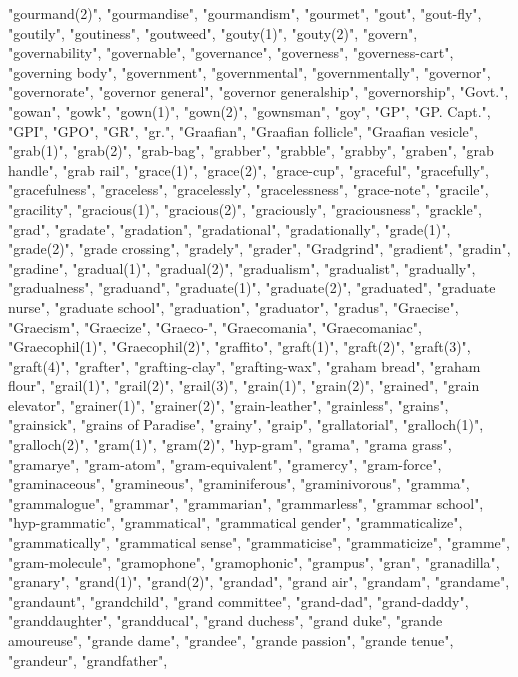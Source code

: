 "gourmand(2)",
"gourmandise",
"gourmandism",
"gourmet",
"gout",
"gout-fly",
"goutily",
"goutiness",
"goutweed",
"gouty(1)",
"gouty(2)",
"govern",
"governability",
"governable",
"governance",
"governess",
"governess-cart",
"governing body",
"government",
"governmental",
"governmentally",
"governor",
"governorate",
"governor general",
"governor generalship",
"governorship",
"Govt.",
"gowan",
"gowk",
"gown(1)",
"gown(2)",
"gownsman",
"goy",
"GP",
"GP. Capt.",
"GPI",
"GPO",
"GR",
"gr.",
"Graafian",
"Graafian follicle",
"Graafian vesicle",
"grab(1)",
"grab(2)",
"grab-bag",
"grabber",
"grabble",
"grabby",
"graben",
"grab handle",
"grab rail",
"grace(1)",
"grace(2)",
"grace-cup",
"graceful",
"gracefully",
"gracefulness",
"graceless",
"gracelessly",
"gracelessness",
"grace-note",
"gracile",
"gracility",
"gracious(1)",
"gracious(2)",
"graciously",
"graciousness",
"grackle",
"grad",
"gradate",
"gradation",
"gradational",
"gradationally",
"grade(1)",
"grade(2)",
"grade crossing",
"gradely",
"grader",
"Gradgrind",
"gradient",
"gradin",
"gradine",
"gradual(1)",
"gradual(2)",
"gradualism",
"gradualist",
"gradually",
"gradualness",
"graduand",
"graduate(1)",
"graduate(2)",
"graduated",
"graduate nurse",
"graduate school",
"graduation",
"graduator",
"gradus",
"Graecise",
"Graecism",
"Graecize",
"Graeco-",
"Graecomania",
"Graecomaniac",
"Graecophil(1)",
"Graecophil(2)",
"graffito",
"graft(1)",
"graft(2)",
"graft(3)",
"graft(4)",
"grafter",
"grafting-clay",
"grafting-wax",
"graham bread",
"graham flour",
"grail(1)",
"grail(2)",
"grail(3)",
"grain(1)",
"grain(2)",
"grained",
"grain elevator",
"grainer(1)",
"grainer(2)",
"grain-leather",
"grainless",
"grains",
"grainsick",
"grains of Paradise",
"grainy",
"graip",
"grallatorial",
"gralloch(1)",
"gralloch(2)",
"gram(1)",
"gram(2)",
"hyp-gram",
"grama",
"grama grass",
"gramarye",
"gram-atom",
"gram-equivalent",
"gramercy",
"gram-force",
"graminaceous",
"gramineous",
"graminiferous",
"graminivorous",
"gramma",
"grammalogue",
"grammar",
"grammarian",
"grammarless",
"grammar school",
"hyp-grammatic",
"grammatical",
"grammatical gender",
"grammaticalize",
"grammatically",
"grammatical sense",
"grammaticise",
"grammaticize",
"gramme",
"gram-molecule",
"gramophone",
"gramophonic",
"grampus",
"gran",
"granadilla",
"granary",
"grand(1)",
"grand(2)",
"grandad",
"grand air",
"grandam",
"grandame",
"grandaunt",
"grandchild",
"grand committee",
"grand-dad",
"grand-daddy",
"granddaughter",
"grandducal",
"grand duchess",
"grand duke",
"grande amoureuse",
"grande dame",
"grandee",
"grande passion",
"grande tenue",
"grandeur",
"grandfather",
